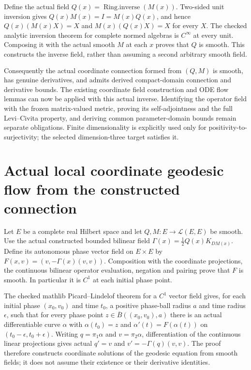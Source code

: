 \documentclass[11pt]{article}
\theoremstyle{definition}
\theoremstyle{remark}
\numberwithin{equation}{section}
\begin{document}
Define the actual field $Q(x)=\operatorname{Ring.inverse}(M(x))$.
Two-sided unit inversion gives $Q(x)M(x)=I=M(x)Q(x)$, and hence
$Q(x)(M(x)X)=X$ and $M(x)(Q(x)X)=X$ for every $X$.
The checked analytic inversion theorem for complete normed algebras
is $C^\infty$ at every unit. Composing it with the actual smooth $M$
at each $x$ proves that $Q$ is smooth. This constructs the inverse
field, rather than assuming a second arbitrary smooth field.

Consequently the actual coordinate connection formed from $(Q,M)$
is smooth, has genuine derivatives, and admits derived compact-domain
connection and derivative bounds. The existing coordinate field
construction and ODE flow lemmas can now be applied with this actual
inverse. Identifying the operator field with the frozen matrix-valued
metric, proving its self-adjointness and the full Levi--Civita property,
and deriving common parameter-domain bounds remain separate obligations.
Finite dimensionality is explicitly used only for positivity-to-surjectivity;
the selected dimension-three target satisfies it.

\clearpage
\section{Actual local coordinate geodesic flow from the constructed connection}
Let $E$ be a complete real Hilbert space and let $Q,M:E\to\mathcal L(E,E)$
be smooth. Use the actual constructed bounded bilinear field
$\Gamma(x)=\frac12 Q(x)K_{DM(x)}$. Define its autonomous phase vector field
on $E\times E$ by
$F(x,v)=(v,-\Gamma(x)(v,v))$.
Composition with the coordinate projections, the continuous bilinear
operator evaluation, negation and pairing prove that $F$ is smooth.
In particular it is $C^1$ at each initial phase point.

The checked mathlib Picard--Lindelof theorem for a $C^1$ vector field gives,
for each initial phase $(x_0,v_0)$ and time $t_0$, a positive phase-ball
radius $a$ and time radius $\epsilon$, such that for every phase point
$z\in\overline B((x_0,v_0),a)$ there is an actual differentiable curve
$\alpha$ with $\alpha(t_0)=z$ and
$\alpha'(t)=F(\alpha(t))$ on
$(t_0-\epsilon,t_0+\epsilon)$.
Writing $q=\pi_1\alpha$ and $v=\pi_2\alpha$, differentiation of the
continuous linear projections gives actual $q'=v$ and
$v'=-\Gamma(q)(v,v)$. The proof therefore constructs coordinate solutions
of the geodesic equation from smooth fields; it does not assume their
existence or their derivative identities.
\end{document}
